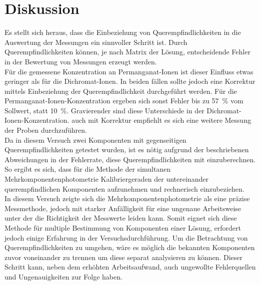 \section{Diskussion}
\label{sec:diskussion}

Es stellt sich heraus, dass die Einbeziehung von Querempfindlichkeiten in die Auswertung der Messungen ein sinnvoller Schritt ist. Durch Querempfindlichkeiten können, je nach Matrix der Lösung, entscheidende Fehler in der Bewertung von Messungen erzeugt werden.\\
Für die gemessene Konzentration an Permanganat-Ionen ist dieser Einfluss etwas geringer als für die Dichromat-Ionen. In beiden fällen sollte jedoch eine Korrektur mittels Einbeziehung der Querempfindlichkeit durchgeführt werden. Für die Permanganat-Ionen-Konzentration ergeben sich sonst Fehler bis zu \SI{57}{\percent} vom Sollwert, statt \SI{10}{\percent}. Gravierender sind diese Unterschiede in der Dichromat-Ionen-Konzentration. auch mit Korrektur empfiehlt es sich eine weitere Messung der Proben durchzuführen.\\
Da in diesem Versuch zwei Komponenten mit gegenseitigen Querempfindlichkeiten getestet wurden, ist es nötig aufgrund der beschriebenen Abweichungen in der Fehlerrate, diese Querempfindlichkeiten mit einzuberechnen. So ergibt es sich, dass für die Methode der simultanen Mehrkomponentenphotometrie  Kalibriergeraden der untereinander querempfindlichen Komponenten aufzunehmen und rechnerisch einzubeziehen. \\
In diesem Versuch zeigte sich die Mehrkomponentenphotometrie als eine präzise Messmethode, jedoch mit starker Anfälligkeit für eine ungenaue Arbeitsweise unter der die Richtigkeit der Messwerte leiden kann. Somit eignet sich diese Methode für multiple Bestimmung von Komponenten einer Lösung, erfordert jedoch einige Erfahrung in der Versuchsdurchführung.\linebreak
Um die Betrachtung von Querempfindlichkeiten zu umgehen, wäre es möglich die bekannten Komponenten zuvor voneinander zu trennen um diese separat analysieren zu können. Dieser Schritt kann, neben dem erhöhten Arbeitsaufwand, auch ungewollte Fehlerquellen und Ungenauigkeiten zur Folge haben.